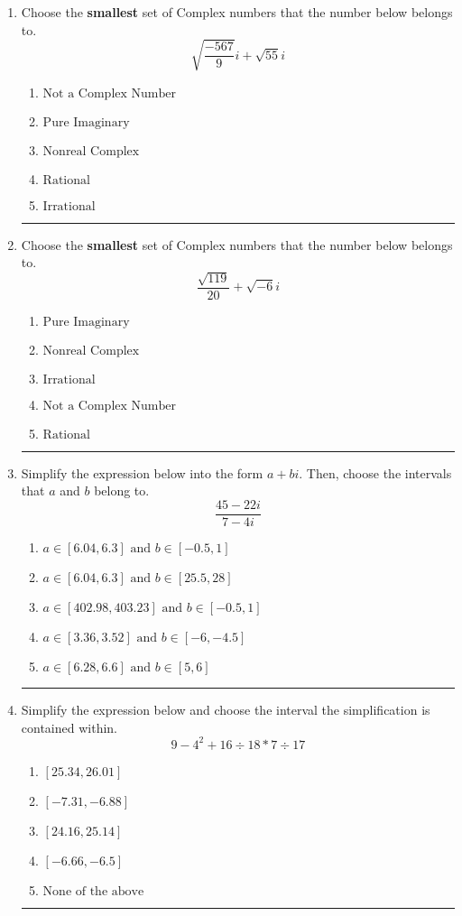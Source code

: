 \documentclass[14pt]{extbook}
\newcommand{\litem}[1]{\item#1\hspace*{-1cm}\rule{\textwidth}{0.4pt}}
\begin{document}
\begin{enumerate}
{\begin{enumerate}[label=\Alph*.]
\end{enumerate} }
\litem{
Choose the \textbf{smallest} set of Complex numbers that the number below belongs to.\[ \sqrt{\frac{-567}{9}} i+\sqrt{55}i \]\begin{enumerate}[label=\Alph*.]
\item \( \text{Not a Complex Number} \)
\item \( \text{Pure Imaginary} \)
\item \( \text{Nonreal Complex} \)
\item \( \text{Rational} \)
\item \( \text{Irrational} \)

\end{enumerate} }
\litem{
Choose the \textbf{smallest} set of Complex numbers that the number below belongs to.\[ \frac{\sqrt{119}}{20}+\sqrt{-6}i \]\begin{enumerate}[label=\Alph*.]
\item \( \text{Pure Imaginary} \)
\item \( \text{Nonreal Complex} \)
\item \( \text{Irrational} \)
\item \( \text{Not a Complex Number} \)
\item \( \text{Rational} \)

\end{enumerate} }
\litem{
Simplify the expression below into the form $a+bi$. Then, choose the intervals that $a$ and $b$ belong to.\[ \frac{45 - 22 i}{7 - 4 i} \]\begin{enumerate}[label=\Alph*.]
\item \( a \in [6.04, 6.3] \text{ and } b \in [-0.5, 1] \)
\item \( a \in [6.04, 6.3] \text{ and } b \in [25.5, 28] \)
\item \( a \in [402.98, 403.23] \text{ and } b \in [-0.5, 1] \)
\item \( a \in [3.36, 3.52] \text{ and } b \in [-6, -4.5] \)
\item \( a \in [6.28, 6.6] \text{ and } b \in [5, 6] \)

\end{enumerate} }
\litem{
Simplify the expression below and choose the interval the simplification is contained within.\[ 9 - 4^2 + 16 \div 18 * 7 \div 17 \]\begin{enumerate}[label=\Alph*.]
\item \( [25.34, 26.01] \)
\item \( [-7.31, -6.88] \)
\item \( [24.16, 25.14] \)
\item \( [-6.66, -6.5] \)
\item \( \text{None of the above} \)


\end{enumerate}}
\end{enumerate}
\end{document}
